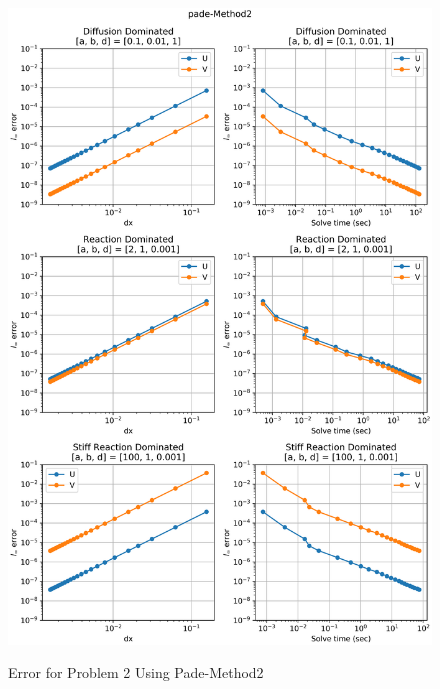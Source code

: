\begin{figure}[t]
  \centering
  \includegraphics[width=5.75in]{images/pade-Method2problem2.png}\\
  \caption{Error for Problem 2 Using Pade-Method2}
  \label{fig:errorProblem2padeM2}
\end{figure} 

